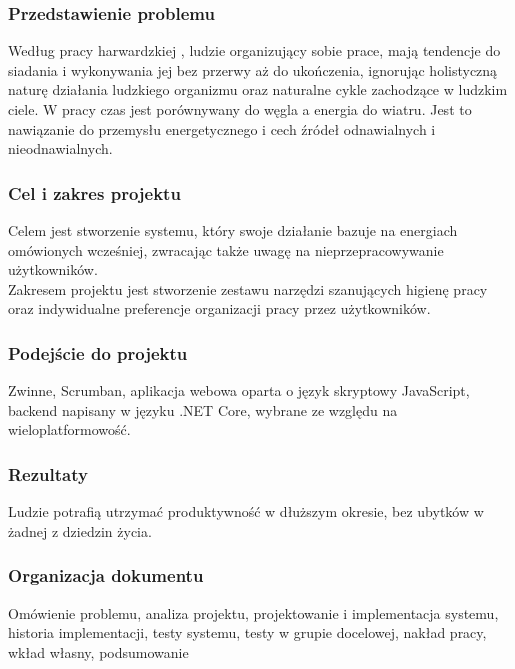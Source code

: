 \documentclass[a4paper,11pt]{report}
\begin{document}
\subsubsection{Przedstawienie problemu}
Według pracy harwardzkiej \cite{Harward}, ludzie organizujący sobie prace, mają tendencje do siadania i wykonywania jej bez przerwy aż do ukończenia,
 ignorując holistyczną naturę działania ludzkiego organizmu oraz naturalne cykle zachodzące w ludzkim ciele.
 W pracy czas jest porównywany do węgla a energia do wiatru.
 Jest to nawiązanie do przemysłu energetycznego i cech źródeł odnawialnych i nieodnawialnych.

\subsubsection{Cel i zakres projektu}
Celem jest stworzenie systemu, który swoje działanie bazuje na energiach omówionych wcześniej,
 zwracając także uwagę na nieprzepracowywanie użytkowników.\\
Zakresem projektu jest stworzenie zestawu narzędzi szanujących higienę pracy
 oraz indywidualne preferencje organizacji pracy przez użytkowników.

\subsubsection{Podejście do projektu}
Zwinne, Scrumban, aplikacja webowa oparta o język skryptowy JavaScript, backend napisany w języku .NET Core, wybrane ze względu na wieloplatformowość.

\subsubsection{Rezultaty}
Ludzie potrafią utrzymać produktywność w dłuższym okresie, bez ubytków w żadnej z dziedzin życia.

\subsubsection{Organizacja dokumentu}
Omówienie problemu, analiza projektu, projektowanie i implementacja systemu, historia implementacji,
 testy systemu, testy w grupie docelowej, nakład pracy, wkład własny, podsumowanie
\end{document}
